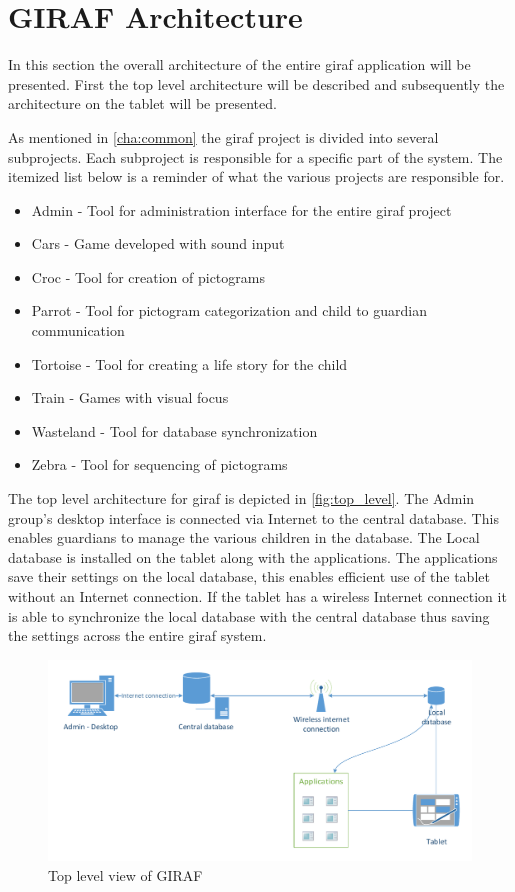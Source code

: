 \section{GIRAF Architecture}
In this section the overall architecture of the entire \ac{giraf} application will be presented. First the top level architecture will be described and subsequently the architecture on the tablet will be presented.

As mentioned in \autoref{cha:common} the \ac{giraf} project is divided into several subprojects. Each subproject is responsible for a specific part of the system. The itemized list below is a reminder of what the various projects are responsible for.

\begin{itemize}
	\item Admin - Tool for administration interface for the entire \ac{giraf} project
	\item Cars - Game developed with sound input
	\item Croc - Tool for creation of pictograms
	\item Parrot - Tool for pictogram categorization and child to guardian communication
	\item Tortoise - Tool for creating a life story for the child
	\item Train - Games with visual focus
	\item Wasteland - Tool for database synchronization
	\item Zebra - Tool for sequencing of pictograms
\end{itemize}

The top level architecture for \ac{giraf} is depicted in \autoref{fig:top_level}. The Admin group's desktop interface is connected via Internet to the central database. This enables guardians to manage the various children in the database. The Local database is installed on the tablet along with the applications. The applications save their settings on the local database, this enables efficient use of the tablet without an Internet connection. If the tablet has a wireless Internet connection it is able to synchronize the local database with the central database thus saving the settings across the entire \ac{giraf} system. 

\begin{figure}[htpb]
\includegraphics[width=\textwidth]{img/top_level.pdf}
\caption{Top level view of GIRAF}
\label{fig:top_level}
\end{figure}

